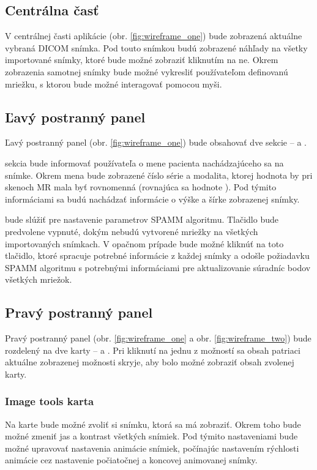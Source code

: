 \subsection {Centrálna časť}
V centrálnej časti aplikácie (obr. \ref{fig:wireframe_one}) bude zobrazená aktuálne vybraná DICOM snímka. Pod touto snímkou budú zobrazené náhľady na všetky importované snímky, ktoré bude možné zobraziť kliknutím na ne. Okrem zobrazenia samotnej snímky bude možné vykresliť používateľom definovanú mriežku, s ktorou bude možné interagovať pomocou myši.

\subsection {Ľavý postranný panel}
Ľavý postranný panel (obr. \ref{fig:wireframe_one}) bude obsahovať dve sekcie --  a .

 sekcia bude informovať používateľa o mene pacienta nachádzajúceho sa na snímke. Okrem mena bude zobrazené číslo série a modalita, ktorej hodnota by pri skenoch MR mala byť rovnomenná (rovnajúca sa hodnote ). Pod týmito informáciami sa budú nachádzať informácie o výške a šírke zobrazenej snímky.

 bude slúžiť pre nastavenie parametrov SPAMM algoritmu. Tlačidlo  bude predvolene vypnuté, dokým nebudú vytvorené mriežky na všetkých importovaných snímkach. V opačnom prípade bude možné kliknúť na toto tlačidlo, ktoré spracuje potrebné informácie z každej snímky a odošle požiadavku SPAMM algoritmu s potrebnými informáciami pre aktualizovanie súradníc bodov všetkých mriežok.

\subsection {Pravý postranný panel}
Pravý postranný panel (obr. \ref{fig:wireframe_one} a obr. \ref{fig:wireframe_two}) bude rozdelený na dve karty --  a . Pri kliknutí na jednu z možností sa obsah patriaci aktuálne zobrazenej možnosti skryje, aby bolo možné zobraziť obsah zvolenej karty.

\subsubsection {Image tools karta}
Na  karte bude možné zvoliť si snímku, ktorá sa má zobraziť. Okrem toho bude možné zmeniť jas a kontrast všetkých snímiek. Pod týmito nastaveniami bude možné upravovať nastavenia animácie snímiek, počínajúc nastavením rýchlosti animácie cez nastavenie počiatočnej a koncovej animovanej snímky.


